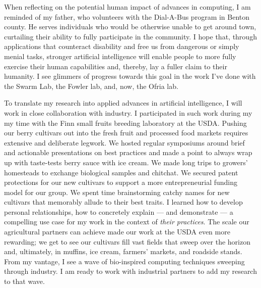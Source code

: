When reflecting on the potential human impact of advances in computing, I am reminded of my father, who volunteers with the Dial-A-Bus program in Benton county.
He serves individuals who would be otherwise unable to get around town, curtailing their ability to fully participate in the community.
I hope that, through applications that counteract disability and free us from dangerous or simply menial tasks, stronger artificial intelligence will enable people to more fully exercise their human capabilities and, thereby, lay a fuller claim to their humanity.
I see glimmers of progress towards this goal in the work I've done with the Swarm Lab, the Fowler lab, and, now, the Ofria lab.

To translate my research into applied advances in artificial intelligence, I will work in close collaboration with industry.
I participated in such work during my my time with the Finn small fruits breeding laboratory at the USDA.
Pushing our berry cultivars out into the fresh fruit and processed food markets requires extensive and deliberate legwork.
We hosted regular symposiums around brief and actionable presentations on best practices and made a point to always wrap up with taste-tests berry sauce with ice cream.
We made long trips to growers' homesteads to exchange biological samples and chitchat.
We secured patent protections for our new cultivars to support a more entrepreneurial funding model for our group.
We spent time brainstorming catchy names for new cultivars that memorably allude to their best traits.
I learned how to develop personal relationships, how to concretely explain --- and demonstrate --- a compelling use case for my work in the context of \textit{their practices}.
The scale our agricultural partners can achieve made our work at the USDA even more rewarding;
we get to see our cultivars fill vast fields that sweep over the horizon and, ultimately, in muffins, ice cream, farmers' markets, and roadside stands.
From my vantage, I see a wave of bio-inspired computing techniques sweeping through industry.
I am ready to work with industrial partners to add my research to that wave.

